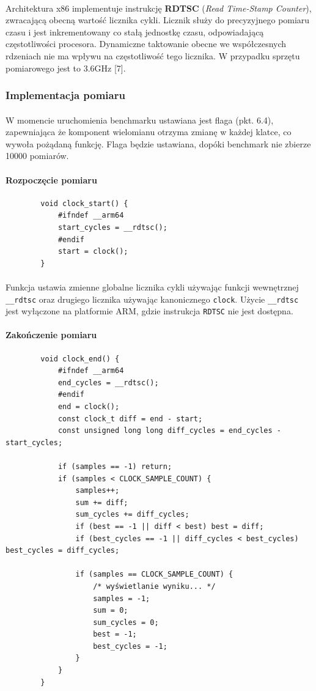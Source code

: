 \documentclass[12pt]{report}
\begin{document}
	\paragraph{}
	Architektura x86 implementuje instrukcję \textbf{RDTSC} (\textit{Read Time-Stamp Counter}), zwracającą obecną wartość licznika cykli. Licznik służy do precyzyjnego pomiaru czasu i jest inkrementowany co stałą jednostkę czasu, odpowiadającą częstotliwości procesora. Dynamiczne taktowanie obecne we współczesnych rdzeniach nie ma wpływu na częstotliwość tego licznika. W przypadku sprzętu pomiarowego jest to 3.6GHz [7].
	
	\subsubsection{Implementacja pomiaru}
	\paragraph{}
	W momencie uruchomienia benchmarku ustawiana jest flaga (pkt. 6.4), zapewniająca że komponent wielomianu otrzyma zmianę w każdej klatce, co wywoła pożądaną funkcję. Flaga będzie ustawiana, dopóki benchmark nie zbierze 10000 pomiarów.
	
	\paragraph{Rozpoczęcie pomiaru}
	\begin{verbatim}
		void clock_start() {
			#ifndef __arm64
			start_cycles = __rdtsc();
			#endif
			start = clock();
		}
	\end{verbatim}
	\paragraph{}
	Funkcja ustawia zmienne globalne licznika cykli używając funkcji wewnętrznej \verb|__rdtsc| oraz drugiego licznika używając kanonicznego \verb|clock|. Użycie \verb|__rdtsc| jest wyłączone na platformie ARM, gdzie instrukcja \verb|RDTSC| nie jest dostępna.\\
	
	
	\paragraph{Zakończenie pomiaru}
	\begin{verbatim}
		void clock_end() {
			#ifndef __arm64
			end_cycles = __rdtsc();
			#endif
			end = clock();
			const clock_t diff = end - start;
			const unsigned long long diff_cycles = end_cycles - start_cycles;
			
			if (samples == -1) return;
			if (samples < CLOCK_SAMPLE_COUNT) {
				samples++;
				sum += diff;
				sum_cycles += diff_cycles;
				if (best == -1 || diff < best) best = diff;
				if (best_cycles == -1 || diff_cycles < best_cycles) best_cycles = diff_cycles;
				
				if (samples == CLOCK_SAMPLE_COUNT) {
					/* wyświetlanie wyniku... */
					samples = -1;
					sum = 0;
					sum_cycles = 0;
					best = -1;
					best_cycles = -1;
				}
			}
		}
	\end{verbatim}
\end{document}
